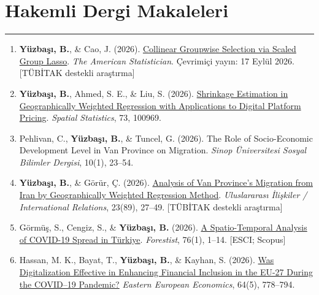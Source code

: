 \documentclass[10pt,a4paper]{article}
\newcommand{\NewPart}[2]{%
	\Needspace{7\baselineskip}%
	\vspace{0.45em}%
	\section*{\sffamily\large\bfseries\color{MidnightBlue}#1 #2}%
	\vspace{-0.7em}\noindent\color{MidnightBlue}\rule{\textwidth}{0.55pt}\color{Black}\vspace{0.25em}}
\newenvironment{etaremune}{\begin{enumerate}}{\end{enumerate}}
\newcommand{\JournalInfo}[2]{\hspace{0.3em}{\small\textsf{[#1; #2]}}}
\newcommand{\TubitakOutput}{{\small\textsf{[TÜBİTAK destekli araştırma]}}}
\begin{document}

\NewPart{Hakemli Dergi Makaleleri}{}


\begin{etaremune}
\renewcommand{\theenumi}{A\arabic{enumi}}

\item {\bf Y\"{u}zba\c{s}{\i}, B.}, \& Cao, J. (2026). \href{https://doi.org/10.1080/00031305.2026.2709494}{Collinear Groupwise Selection via Scaled Group Lasso}. \textit{The American Statistician}. Çevrimiçi yayın: 17 Eylül 2026. \JournalInfo{SCIE}{Q1} \TubitakOutput

\item {\bf Y\"{u}zba\c{s}{\i}, B.}, Ahmed, S. E., \& Liu, S. (2026). \href{https://doi.org/10.1016/j.spasta.2026.100969}{Shrinkage Estimation in Geographically Weighted Regression with Applications to Digital Platform Pricing}. \textit{Spatial Statistics}, 73, 100969. \JournalInfo{SCIE}{Q1}

\item Pehlivan, C., {\bf Y\"{u}zba\c{s}{\i}, B.}, \& Tuncel, G. (2026). The Role of Socio-Economic Development Level in Van Province on Migration. \textit{Sinop \"{U}niversitesi Sosyal Bilimler Dergisi}, 10(1), 23--54.

\item {\bf Y\"{u}zba\c{s}{\i}, B.}, \& G\"{o}r\"{u}r, \c{C}. (2026). \href{https://doi.org/10.33458/uidergisi.1853672}{Analysis of Van Province's Migration from Iran by Geographically Weighted Regression Method}. \textit{Uluslararas{\i} \.{I}li\c{s}kiler / International Relations}, 23(89), 27--49. \JournalInfo{SSCI}{Q3} \TubitakOutput

\item G\"{o}rm\"{u}\c{s}, S., Cengiz, S., \& {\bf Y\"{u}zba\c{s}{\i}, B.} (2026). \href{https://forestist.org/index.php/pub/article/view/2688}{A Spatio-Temporal Analysis of COVID-19 Spread in T\"{u}rkiye}. \textit{Forestist}, 76(1), 1--14. {\small\textsf{[ESCI; Scopus]}}

\item Hassan, M. K., Bayat, T., {\bf Y\"{u}zba\c{s}{\i}, B.}, \& Kayhan, S. (2026). \href{https://doi.org/10.1080/00128775.2025.2546468}{Was Digitalization Effective in Enhancing Financial Inclusion in the EU-27 During the COVID--19 Pandemic?} \textit{Eastern European Economics}, 64(5), 778--794. \JournalInfo{SSCI}{Q3}


\end{etaremune}
\end{document}
